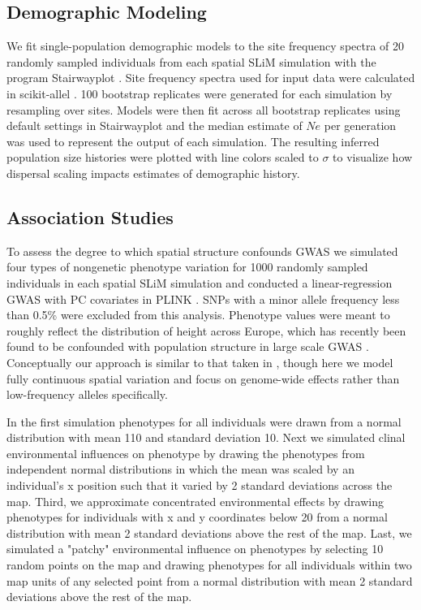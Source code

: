 \documentclass[9pt,twocolumn,twoside,lineno]{gsajnl}
\begin{document}
\subsection{Demographic Modeling}
We fit single-population demographic models to the site frequency spectra of 20 randomly sampled individuals from each spatial SLiM simulation with the program Stairwayplot \citep{Liu2015}. Site frequency spectra used for input data were calculated in scikit-allel \citep{Miles2017}. 100 bootstrap replicates were generated for each simulation by resampling over sites. Models were then fit across all bootstrap replicates using default settings in Stairwayplot and the median estimate of $Ne$ per generation was used to represent the output of each simulation. The resulting inferred population size histories were plotted with line colors scaled to $\sigma$ to visualize how dispersal scaling impacts estimates of demographic history.  

\subsection{Association Studies}
To assess the degree to which spatial structure confounds GWAS we simulated four types of nongenetic phenotype variation for 1000 randomly sampled individuals in each spatial SLiM simulation and conducted a linear-regression GWAS with PC covariates in PLINK \citep{PURCELL2007}. SNPs with a minor allele frequency less than 0.5\% were excluded from this analysis. Phenotype values were meant to roughly reflect the distribution of height across Europe, which has recently been found to be confounded with population structure in large scale GWAS \citep{Berg2018,Sohail2018}. Conceptually our approach is similar to that taken in \citep{Mathieson2012}, though here we model fully continuous spatial variation and focus on genome-wide effects rather than low-frequency alleles specifically. 

In the first simulation phenotypes for all individuals were drawn from a normal distribution with mean 110 and standard deviation 10. Next we simulated clinal environmental influences on phenotype by drawing the phenotypes from independent normal distributions in which the mean was scaled by an individual's x position such that it varied by 2 standard deviations across the map. Third, we approximate concentrated environmental effects by drawing phenotypes for individuals with x and y coordinates below 20 from a normal distribution with mean 2 standard deviations above the rest of the map. Last, we simulated a "patchy" environmental influence on phenotypes by selecting 10 random points on the map and drawing phenotypes for all individuals within two map units of any selected point from a normal distribution with mean 2 standard deviations above the rest of the map. 
\end{document}

